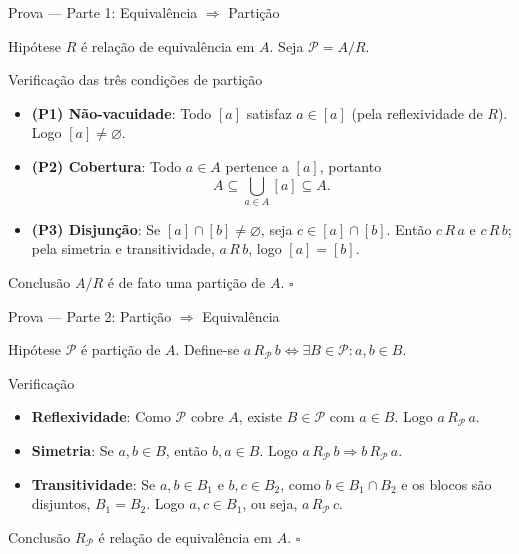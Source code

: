 \documentclass[9pt]{beamer}
\begin{document}
\begin{frame}{Prova — Parte 1: Equivalência $\Rightarrow$ Partição}

\begin{block}{Hipótese}
$R$ é relação de equivalência em $A$. Seja $\mathcal{P} = A/R$.
\end{block}

\begin{block}{Verificação das três condições de partição}
\begin{itemize}
  \item \textbf{(P1) Não-vacuidade}: Todo $[a]$ satisfaz $a \in [a]$ (pela reflexividade de $R$). Logo $[a] \neq \varnothing$.
  \item \textbf{(P2) Cobertura}: Todo $a \in A$ pertence a $[a]$, portanto
  \[
  A \subseteq \bigcup_{a \in A} [a] \subseteq A.
  \]
  \item \textbf{(P3) Disjunção}: Se $[a] \cap [b] \neq \varnothing$, seja $c \in [a] \cap [b]$. Então $c\,R\,a$ e $c\,R\,b$; pela simetria e transitividade, $a\,R\,b$, logo $[a] = [b]$.
\end{itemize}
\end{block}

\begin{block}{Conclusão}
$A/R$ é de fato uma partição de $A$. $\square$
\end{block}

\end{frame}

\begin{frame}{Prova — Parte 2: Partição $\Rightarrow$ Equivalência}

\begin{block}{Hipótese}
$\mathcal{P}$ é partição de $A$. Define-se $a\,R_\mathcal{P}\,b \Leftrightarrow \exists B \in \mathcal{P}: a,b \in B$.
\end{block}

\begin{block}{Verificação}
\begin{itemize}
  \item \textbf{Reflexividade}: Como $\mathcal{P}$ cobre $A$, existe $B \in \mathcal{P}$ com $a \in B$. Logo $a\,R_\mathcal{P}\,a$.
  \item \textbf{Simetria}: Se $a,b \in B$, então $b,a \in B$. Logo $a\,R_\mathcal{P}\,b \Rightarrow b\,R_\mathcal{P}\,a$.
  \item \textbf{Transitividade}: Se $a,b \in B_1$ e $b,c \in B_2$, como $b \in B_1 \cap B_2$ e os blocos são disjuntos, $B_1 = B_2$. Logo $a,c \in B_1$, ou seja, $a\,R_\mathcal{P}\,c$.
\end{itemize}
\end{block}

\begin{block}{Conclusão}
$R_\mathcal{P}$ é relação de equivalência em $A$. $\square$
\end{block}

\end{frame}
\end{document}
